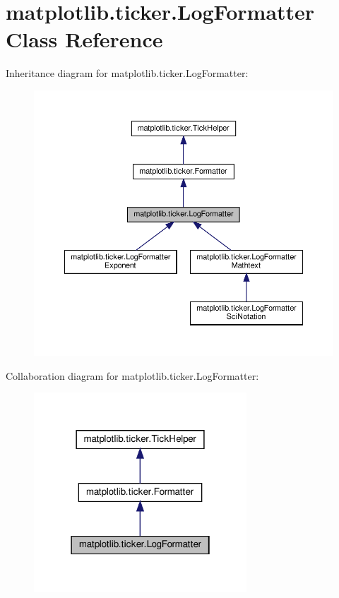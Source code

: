 \hypertarget{classmatplotlib_1_1ticker_1_1LogFormatter}{}\section{matplotlib.\+ticker.\+Log\+Formatter Class Reference}
\label{classmatplotlib_1_1ticker_1_1LogFormatter}


Inheritance diagram for matplotlib.\+ticker.\+Log\+Formatter\+:
\nopagebreak
\begin{figure}[H]
\begin{center}
\leavevmode
\includegraphics[width=350pt]{classmatplotlib_1_1ticker_1_1LogFormatter__inherit__graph}
\end{center}
\end{figure}


Collaboration diagram for matplotlib.\+ticker.\+Log\+Formatter\+:
\nopagebreak
\begin{figure}[H]
\begin{center}
\leavevmode
\includegraphics[width=226pt]{classmatplotlib_1_1ticker_1_1LogFormatter__coll__graph}
\end{center}
\end{figure}
